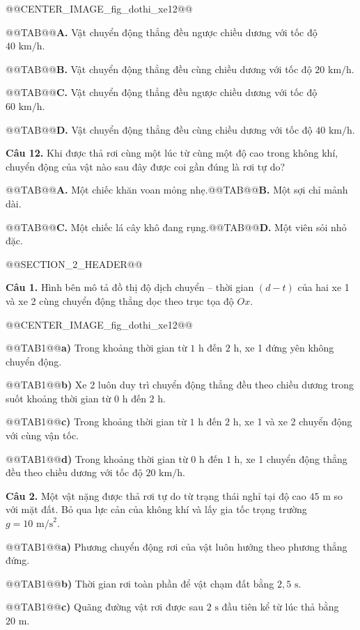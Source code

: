 \documentclass{article}
\begin{document}
@@CENTER_IMAGE_fig_dothi_xe12@@

@@TAB@@\textbf{A.} Vật chuyển động thẳng đều ngược chiều dương với tốc độ $40\text{ km/h}$.

@@TAB@@\textbf{B.} Vật chuyển động thẳng đều cùng chiều dương với tốc độ $20\text{ km/h}$.

@@TAB@@\textbf{C.} Vật chuyển động thẳng đều ngược chiều dương với tốc độ $60\text{ km/h}$.

@@TAB@@\textbf{D.} Vật chuyển động thẳng đều cùng chiều dương với tốc độ $40\text{ km/h}$.

\textbf{Câu 12.} Khi được thả rơi cùng một lúc từ cùng một độ cao trong không khí, chuyển động của vật nào sau đây được coi gần đúng là rơi tự do?

@@TAB@@\textbf{A.} Một chiếc khăn voan mỏng nhẹ.@@TAB@@\textbf{B.} Một sợi chỉ mảnh dài.

@@TAB@@\textbf{C.} Một chiếc lá cây khô đang rụng.@@TAB@@\textbf{D.} Một viên sỏi nhỏ đặc.

@@SECTION_2_HEADER@@

\textbf{Câu 1.} Hình bên mô tả đồ thị độ dịch chuyển -- thời gian $(d - t)$ của hai xe 1 và xe 2 cùng chuyển động thẳng dọc theo trục tọa độ $Ox$.

@@CENTER_IMAGE_fig_dothi_xe12@@

@@TAB1@@\textbf{a)} Trong khoảng thời gian từ $1\text{ h}$ đến $2\text{ h}$, xe 1 đứng yên không chuyển động.

@@TAB1@@\textbf{b)} Xe 2 luôn duy trì chuyển động thẳng đều theo chiều dương trong suốt khoảng thời gian từ $0\text{ h}$ đến $2\text{ h}$.

@@TAB1@@\textbf{c)} Trong khoảng thời gian từ $1\text{ h}$ đến $2\text{ h}$, xe 1 và xe 2 chuyển động với cùng vận tốc.

@@TAB1@@\textbf{d)} Trong khoảng thời gian từ $0\text{ h}$ đến $1\text{ h}$, xe 1 chuyển động thẳng đều theo chiều dương với tốc độ $20\text{ km/h}$.

\textbf{Câu 2.} Một vật nặng được thả rơi tự do từ trạng thái nghỉ tại độ cao $45\text{ m}$ so với mặt đất. Bỏ qua lực cản của không khí và lấy gia tốc trọng trường $g = 10\text{ m/s}^2$.

@@TAB1@@\textbf{a)} Phương chuyển động rơi của vật luôn hướng theo phương thẳng đứng.

@@TAB1@@\textbf{b)} Thời gian rơi toàn phần để vật chạm đất bằng $2{,}5\text{ s}$.

@@TAB1@@\textbf{c)} Quãng đường vật rơi được sau $2\text{ s}$ đầu tiên kể từ lúc thả bằng $20\text{ m}$.
\end{document}
